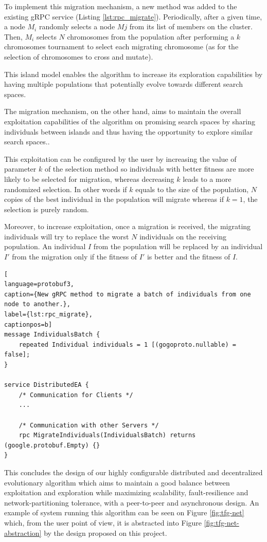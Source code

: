 To implement this migration mechanism, a new method was added to the existing gRPC service (Listing \ref{lst:rpc_migrate}). Periodically, after a given time, a node $M_{i}$ randomly selects a node $M{j}$ from its list of members on the cluster. Then, $M_{i}$ selects $N$ chromosomes from the population after performing a $k$ chromosomes tournament to select each migrating chromosome (as for the selection of chromosomes to cross and mutate).

This island model enables the algorithm to increase its exploration capabilities by having multiple populations that potentially evolve towards different search spaces. 

The migration mechanism, on the other hand, aims to maintain the overall exploitation capabilities of the algorithm on promising search spaces by sharing individuals between islands and thus having the opportunity to explore similar search spaces.. 

This exploitation can be configured by the user by increasing the value of parameter $k$ of the selection method so individuals with better fitness are more likely to be selected for migration, whereas decreasing $k$ leads to a more randomized selection. In other words if $k$ equals to the size of the population, $N$ copies of the best individual in the population will migrate whereas if $k = 1$, the selection is purely random.

Moreover, to increase exploitation, once a migration is received, the migrating individuals will try to replace the worst $N$ individuals on the receiving population. An individual $I$ from the population  will be replaced by an individual $I'$ from the migration only if the fitness of $I'$ is better and the fitness of $I$.

\begin{lstlisting}[
language=protobuf3,
caption={New gRPC method to migrate a batch of individuals from one node to another.},
label={lst:rpc_migrate},
captionpos=b]
message IndividualsBatch {
    repeated Individual individuals = 1 [(gogoproto.nullable) = false];
}

service DistributedEA {
    /* Communication for Clients */
    ...

    /* Communication with other Servers */
    rpc MigrateIndividuals(IndividualsBatch) returns (google.protobuf.Empty) {}
}
\end{lstlisting}

This concludes the design of our highly configurable distributed and decentralized evolutionary algorithm which aims to maintain a good balance between exploitation and exploration while maximizing scalability, fault-resilience and network-partitioning tolerance, with a peer-to-peer and asynchronous design. An example of system running this algorithm can be seen on Figure \ref{fig:tfg-net} which, from the user point of view, it is abstracted into Figure \ref{fig:tfg-net-abstraction} by the design proposed on this project.

